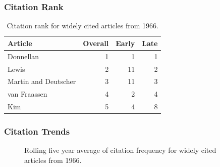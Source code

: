\documentclass[
  10pt,
  letterpaper,
  DIV=11,
  numbers=noendperiod,
  twoside]{scrartcl}
\begin{document}
\subsubsection*{Citation Rank}\label{sec-rank-1966}

\begin{longtable}[]{@{}lrrr@{}}

\caption{\label{tbl-citation-rank-1966}Citation rank for widely cited
articles from 1966.}

\tabularnewline

\toprule\noalign{}
Article & Overall & Early & Late \\
\midrule\noalign{}
\endhead
\bottomrule\noalign{}
\endlastfoot
Donnellan & 1 & 1 & 1 \\
Lewis & 2 & 11 & 2 \\
Martin and Deutscher & 3 & 11 & 3 \\
van Fraassen & 4 & 2 & 4 \\
Kim & 5 & 4 & 8 \\

\end{longtable}

\subsubsection*{Citation Trends}\label{sec-trends-1966}

\begin{figure}


\caption{\label{fig-citation-spaghetti-1966}Rolling five year average of
citation frequency for widely cited articles from 1966.}

\end{figure}%
\end{document}
